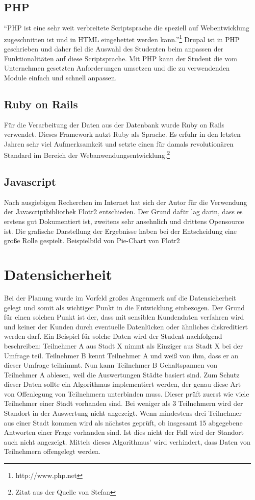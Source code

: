 \subsection{PHP}
``PHP ist eine sehr weit verbreitete Scriptsprache die speziell auf Webentwicklung zugeschnitten ist und in HTML eingebettet werden kann.''\footnote{http://www.php.net}
Drupal ist in PHP geschrieben und daher fiel die Auswahl des Studenten beim anpassen der Funktionalitäten auf diese Scriptsprache. Mit PHP kann der Student die vom Unternehmen gesetzten Anforderungen umsetzen und die zu verwendenden Module einfach und schnell anpassen.
\subsection{Ruby on Rails}
Für die Verarbeitung der Daten aus der Datenbank wurde Ruby on Rails verwendet. 
Dieses Framework nutzt Ruby als Sprache. Es erfuhr in den letzten Jahren sehr viel Aufmerksamkeit und setzte einen für damals revolutionären Standard im Bereich der Webanwendungsentwicklung.\footnote{Zitat aus der Quelle von Stefan}
\subsection{Javascript}
Nach ausgiebigen Recherchen im Internet hat sich der Autor für die Verwendung der Javascriptbibliothek Flotr2 entschieden. Der Grund dafür lag darin, dass es erstens gut Dokumentiert ist, zweitens sehr ansehnlich und drittens Opensource ist. Die grafische Darstellung der Ergebnisse haben bei der Entscheidung eine große Rolle gespielt.
{Beispielbild von Pie-Chart von Flotr2}
\section{Datensicherheit}
Bei der Planung wurde im Vorfeld großes Augenmerk auf die Datensicherheit gelegt und somit als wichtiger Punkt in die Entwicklung einbezogen. Der Grund für einen solchen Punkt ist der, dass mit sensiblen Kundendaten verfahren wird und keiner der Kunden durch eventuelle Datenlücken oder ähnliches diskreditiert werden darf.
Ein Beispiel für solche Daten wird der Student nachfolgend beschreiben: 
Teilnehmer A aus Stadt X nimmt als Einziger aus Stadt X bei der Umfrage teil. Teilnehmer B kennt Teilnehmer A und weiß von ihm, dass er an dieser Umfrage teilnimmt. Nun kann Teilnehmer B Gehaltspannen von Teilnehmer A ablesen, weil die Auswertungen St\"adte basiert sind. Zum Schutz dieser Daten sollte ein Algorithmus implementiert werden, der genau diese Art von Offenlegung von Teilnehmern unterbinden muss. Dieser pr\"uft zuerst wie viele Teilnehmer einer Stadt vorhanden sind. Bei weniger als 3 Teilnehmern wird der Standort in der Auswertung nicht angezeigt. Wenn mindestens drei Teilnehmer aus einer Stadt kommen wird als n\"achstes gepr\"uft, ob insgesamt 15 abgegebene Antworten einer Frage vorhanden sind. Ist dies nicht der Fall wird der Standort auch nicht angezeigt. Mittels dieses Algorithmus' wird verhindert, dass Daten von Teilnehmern offengelegt werden.